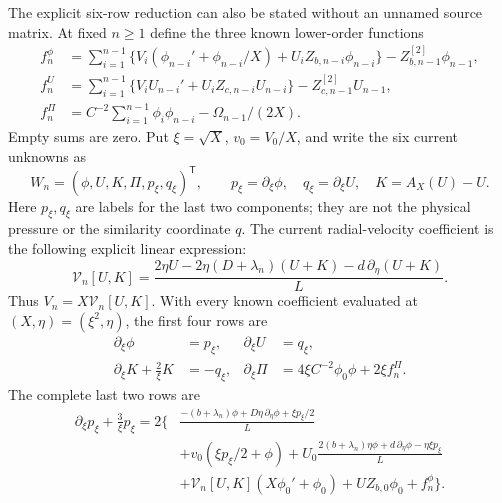 The explicit six-row reduction can also be stated without an
unnamed source matrix. At fixed $n\geq1$ define the three known
lower-order functions
\begin{align*}
 f_n^\phi
 &=\sum_{i=1}^{n-1}
     \{V_i(\phi_{n-i}'+\phi_{n-i}/X)
                         +U_iZ_{b,n-i}\phi_{n-i}\}
                   -Z^{[2]}_{b,n-1}\phi_{n-1},\\
 f_n^U
 &=\sum_{i=1}^{n-1}
     \{V_iU_{n-i}'+U_iZ_{c,n-i}U_{n-i}\}
                   -Z^{[2]}_{c,n-1}U_{n-1},\\
 f_n^\Pi
 &=C^{-2}\sum_{i=1}^{n-1}\phi_i\phi_{n-i}
                                     -\Omega_{n-1}/(2X).
\end{align*}
Empty sums are zero. Put $\xi=\sqrt X$, $v_0=V_0/X$, and
write the six current unknowns as
\[
 W_n=(\phi,U,K,\Pi,p_\xi,q_\xi)^{\mathsf T},\qquad
 p_\xi=\partial_\xi\phi,\quad q_\xi=\partial_\xi U,\quad
 K=A_X(U)-U .
\]
Here $p_\xi,q_\xi$ are labels for the last two components;
they are not the physical pressure or the similarity
coordinate $q$. The current radial-velocity coefficient is
the following explicit linear expression:
\[
 \mathcal V_n[U,K]=
 \frac{2\eta U-2\eta(D+\lambda_n)(U+K)
                       -d\,\partial_\eta(U+K)}L .
\]
Thus $V_n=X\mathcal V_n[U,K]$. With every known coefficient
evaluated at $(X,\eta)=(\xi^2,\eta)$, the first four rows are
\begin{equation}
\begin{aligned}
 \partial_\xi\phi&=p_\xi,&
 \partial_\xi U&=q_\xi,\\
 \partial_\xi K+\frac2\xi K&=-q_\xi,&
 \partial_\xi\Pi
      &=4\xi C^{-2}\phi_0\phi+2\xi f_n^\Pi .
\end{aligned}
 \label{eq:cq-source-explicit-first-four-rows}
\end{equation}
The complete last two rows are
\begin{equation}
\begin{split}
 \partial_\xi p_\xi+\frac3\xi p_\xi
 =2\biggl\{&
 \frac{-(b+\lambda_n)\phi+D\eta\,\partial_\eta\phi
                                     +\xi p_\xi/2}{L}\\
 &+v_0(\xi p_\xi/2+\phi)
 +U_0\frac{2(b+\lambda_n)\eta\phi+d\,\partial_\eta\phi
                                           -\eta\xi p_\xi}{L}\\
 &+\mathcal V_n[U,K](X\phi_0'+\phi_0)
                    +U Z_{b,0}\phi_0+f_n^\phi\biggr\}.
\end{split}
 \label{eq:cq-source-explicit-angular-row}
\end{equation}
